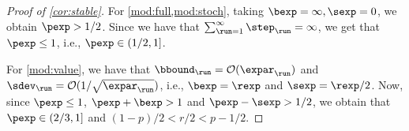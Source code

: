 \begin{proof}[Proof of \cref{cor:stable}]
For \cref{mod:full,mod:stoch}, taking $\bexp = \infty, \sexp = 0$, we obtain $\pexp > 1/2$. Since we have that $\sum_{\run=1}^{\infty}\step_\run = \infty$, we get that $\pexp \leq 1$, i.e., $\pexp \in (1/2,1]$.

For \cref{mod:value}, we have that $\curr[\bbound] = \bigoh(\curr[\expar])$ and $\curr[\sdev] = \bigoh(1/\sqrt{\curr[\expar]})$, i.e., $\bexp = \rexp$ and $\sexp = \rexp/2$. Now, since $\pexp \leq 1$, $\pexp + \bexp >1$ and $\pexp - \sexp > 1/2$, we obtain that $\pexp \in (2/3,1]$ and $(1-p)/2 < r/2 < p - 1/2$.
\end{proof}
